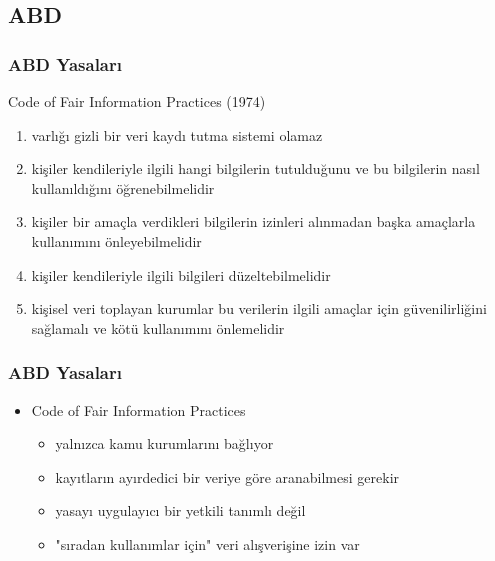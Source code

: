 \documentclass[dvipsnames]{beamer}
\theoremstyle{definition}
\theoremstyle{example}
\theoremstyle{plain}
\begin{document}
\subsection{ABD}

\begin{frame}
  \frametitle{ABD Yasaları}

  \begin{block}{Code of Fair Information Practices (1974)}
    \begin{enumerate}
      \item varlığı gizli bir veri kaydı tutma sistemi olamaz

      \pause
      \item kişiler kendileriyle ilgili hangi bilgilerin tutulduğunu ve bu
        bilgilerin nasıl kullanıldığını öğrenebilmelidir

      \pause
      \item kişiler bir amaçla verdikleri bilgilerin izinleri alınmadan başka
        amaçlarla kullanımını önleyebilmelidir

      \pause
      \item kişiler kendileriyle ilgili bilgileri düzeltebilmelidir

      \pause
      \item kişisel veri toplayan kurumlar bu verilerin ilgili amaçlar için
        güvenilirliğini sağlamalı ve kötü kullanımını önlemelidir
    \end{enumerate}
  \end{block}
\end{frame}

\begin{frame}
  \frametitle{ABD Yasaları}

  \begin{itemize}
    \item Code of Fair Information Practices

    \begin{itemize}
      \item yalnızca kamu kurumlarını bağlıyor

      \pause
      \item kayıtların ayırdedici bir veriye göre aranabilmesi gerekir

      \pause
      \item yasayı uygulayıcı bir yetkili tanımlı değil

      \pause
      \item "sıradan kullanımlar için" veri alışverişine izin var
    \end{itemize}
  \end{itemize}
\end{frame}
\end{document}
